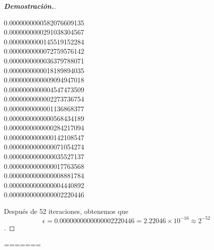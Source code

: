 \documentclass{article}
\begin{document}
\begin{enumerate}
\begin{mdframed}[
			      linecolor=darkgray,
			      backgroundcolor=white]
\begin{proof}[\textbf{Demostraci\'on.}]
\begin{center}
				      0.0000000000582076609135\\
				      0.0000000000291038304567\\
				      0.0000000000145519152284\\
				      0.0000000000072759576142\\
				      0.0000000000036379788071\\
				      0.0000000000018189894035\\
				      0.0000000000009094947018\\
				      0.0000000000004547473509\\
				      0.0000000000002273736754\\
				      0.0000000000001136868377\\
				      0.0000000000000568434189\\
				      0.0000000000000284217094\\
				      0.0000000000000142108547\\
				      0.0000000000000071054274\\
				      0.0000000000000035527137\\
				      0.0000000000000017763568\\
				      0.0000000000000008881784\\
				      0.0000000000000004440892\\
				      0.0000000000000002220446\\

			      \end{center}

			      Despu\'es de 52 iteraciones, obtenemos que $$\epsilon = 0.0000000000000002220446 = 2.22046\times10^{-16} \approx 2^{-52}$$.
			      
		      \end{proof}
	      \end{mdframed}

\end{enumerate}
=======
	
\end{document}
